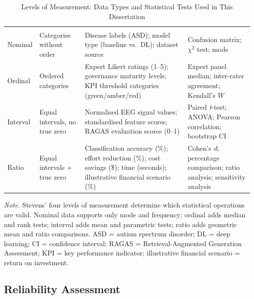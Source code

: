 {\tablestripes\tablefontsize
\begin{xltabular}{\textwidth}{@{} >{\raggedright\arraybackslash}p{1.5cm} L L L @{}}
\caption[Measurement Scales]{Levels of Measurement: Data Types and Statistical Tests Used in This Dissertation}\label{tab:measurement_scales} \\
\toprule
{} &  &  &  \\
\midrule
\endfirsthead
\toprule
{} &  &  &  \\
\midrule
\endhead
\bottomrule
\endlastfoot
Nominal & Categories without order & Disease labels (ASD); model type (baseline vs.\ DL); dataset source & Confusion matrix; $\chi^2$ test; mode \\
\addlinespace
Ordinal & Ordered categories & Expert Likert ratings (1--5); governance maturity levels; KPI threshold categories (green/amber/red) & Expert panel median; inter-rater agreement; Kendall's $W$ \\
\addlinespace
Interval & Equal intervals, no true zero & Normalised EEG signal values; standardised feature scores; RAGAS evaluation scores (0--1) & Paired \textit{t}-test; ANOVA; Pearson correlation; bootstrap CI \\
\addlinespace
Ratio & Equal intervals + true zero & Classification accuracy (\%); effort reduction (\%); cost savings (\$); time (seconds); illustrative financial scenario (\%) & Cohen's \textit{d}; percentage comparison; ratio analysis; sensitivity analysis \\
\end{xltabular}}
\vspace{0.5em}
\noindent\textit{Note.} Stevens' four levels of measurement determine which statistical operations are valid. Nominal data supports only mode and frequency; ordinal adds median and rank tests; interval adds mean and parametric tests; ratio adds geometric mean and ratio comparisons. ASD = autism spectrum disorder;   DL = deep learning; CI = confidence interval; RAGAS = Retrieval-Augmented Generation Assessment; KPI = key performance indicator; illustrative financial scenario = return on investment.

\subsection{Reliability Assessment}

